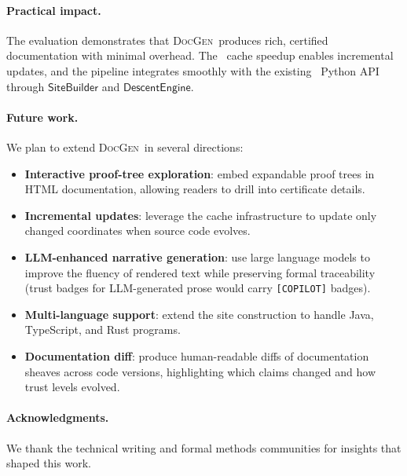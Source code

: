 \documentclass[11pt]{article}
\newcommand{\DocGen}{\textsc{DocGen}}
\begin{document}
\paragraph{Practical impact.}
The evaluation demonstrates that \DocGen\ produces rich, certified
documentation with minimal overhead.  The \suppCacheSpeedup\ cache
speedup enables incremental updates, and the pipeline integrates
smoothly with the existing \JuGeo\ Python API through
$\mathsf{SiteBuilder}$ and $\mathsf{DescentEngine}$.

\paragraph{Future work.}
We plan to extend \DocGen\ in several directions:
\begin{itemize}[noitemsep]
\item \textbf{Interactive proof-tree exploration}: embed expandable
  proof trees in HTML documentation, allowing readers to drill into
  certificate details.
\item \textbf{Incremental updates}: leverage the cache infrastructure
  to update only changed coordinates when source code evolves.
\item \textbf{LLM-enhanced narrative generation}: use large language
  models to improve the fluency of rendered text while preserving
  formal traceability (trust badges for LLM-generated prose would
  carry \texttt{[COPILOT]} badges).
\item \textbf{Multi-language support}: extend the site construction
  to handle Java, TypeScript, and Rust programs.
\item \textbf{Documentation diff}: produce human-readable diffs of
  documentation sheaves across code versions, highlighting which
  claims changed and how trust levels evolved.
\end{itemize}

\paragraph{Acknowledgments.}
We thank the technical writing and formal methods communities for
insights that shaped this work.
\end{document}
